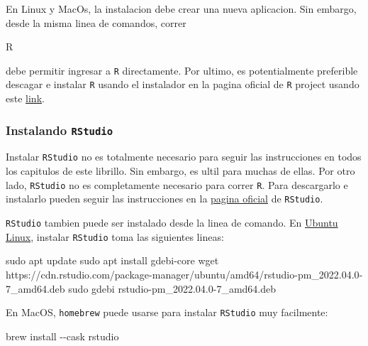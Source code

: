 \documentclass[
]{book}
\newenvironment{Shaded}{\begin{snugshade}}{\end{snugshade}}
\newcommand{\AttributeTok}[1]{\textcolor[rgb]{0.77,0.63,0.00}{#1}}
\newcommand{\ExtensionTok}[1]{#1}
\newcommand{\FunctionTok}[1]{\textcolor[rgb]{0.00,0.00,0.00}{#1}}
\newcommand{\NormalTok}[1]{#1}
\begin{document}
En Linux y MacOs, la instalacion debe crear una nueva aplicacion. Sin embargo, desde la misma linea de comandos, correr

\begin{Shaded}
\begin{Highlighting}[]
\ExtensionTok{R}
\end{Highlighting}
\end{Shaded}

debe permitir ingresar a \texttt{R} directamente. Por ultimo, es potentialmente preferible descagar e instalar \texttt{R} usando el instalador en la pagina oficial de \texttt{R} project usando este \href{https://cran.r-project.org/bin/windows/base/}{link}.

\hypertarget{instalando-rstudio}{%
\subsubsection{\texorpdfstring{Instalando \texttt{RStudio}}{Instalando RStudio}}\label{instalando-rstudio}}

Instalar \texttt{RStudio} no es totalmente necesario para seguir las instrucciones en todos los capitulos de este librillo. Sin embargo, es ultil para muchas de ellas. Por otro lado, \texttt{RStudio} no es completamente necesario para correr \texttt{R}. Para descargarlo e instalarlo pueden seguir las instrucciones en la \href{https://www.rstudio.com/products/rstudio/}{pagina oficial} de \texttt{RStudio}.

\texttt{RStudio} tambien puede ser instalado desde la linea de comando. En \href{https://docs.rstudio.com/rpm/installation/}{Ubuntu Linux}, instalar \texttt{RStudio} toma las siguientes lineas:

\begin{Shaded}
\begin{Highlighting}[]
\FunctionTok{sudo}\NormalTok{ apt update}
\FunctionTok{sudo}\NormalTok{ apt install gdebi{-}core}
\FunctionTok{wget}\NormalTok{ https://cdn.rstudio.com/package{-}manager/ubuntu/amd64/rstudio{-}pm\_2022.04.0{-}7\_amd64.deb}
\FunctionTok{sudo}\NormalTok{ gdebi rstudio{-}pm\_2022.04.0{-}7\_amd64.deb}
\end{Highlighting}
\end{Shaded}

En MacOS, \texttt{homebrew} puede usarse para instalar \texttt{RStudio} muy facilmente:

\begin{Shaded}
\begin{Highlighting}[]
\ExtensionTok{brew}\NormalTok{ install }\AttributeTok{{-}{-}cask}\NormalTok{ rstudio}
\end{Highlighting}
\end{Shaded}
\end{document}
